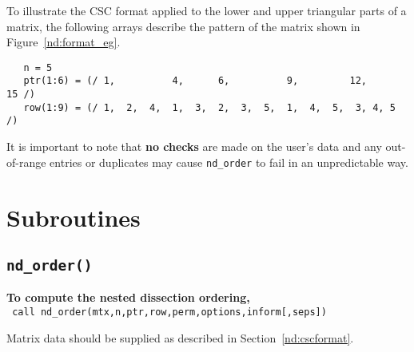 To illustrate the CSC format applied to the lower and upper triangular parts of 
a matrix, the following arrays describe the pattern of the matrix shown in
Figure~\ref{nd:format_eg}.
\begin{verbatim}
   n = 5
   ptr(1:6) = (/ 1,          4,      6,          9,         12,       15 /)
   row(1:9) = (/ 1,  2,  4,  1,  3,  2,  3,  5,  1,  4,  5,  3, 4, 5 /)
\end{verbatim}


It is important to note
that {\bf no checks} are made on the user's data and any out-of-range entries 
or duplicates may cause {\tt nd\_order} to fail in an unpredictable way. 



\section{Subroutines}


\subsection{{\tt nd\_order()}}

{\bf To compute the nested dissection ordering,}
   \vspace*{0.3cm} \\
   \texttt{\hspace*{0.2cm} call nd\_order(mtx,n,ptr,row,perm,options,inform[,seps])}
\vspace{0.3em}

\noindent
Matrix data should be supplied as described in Section~\ref{nd:cscformat}. 

